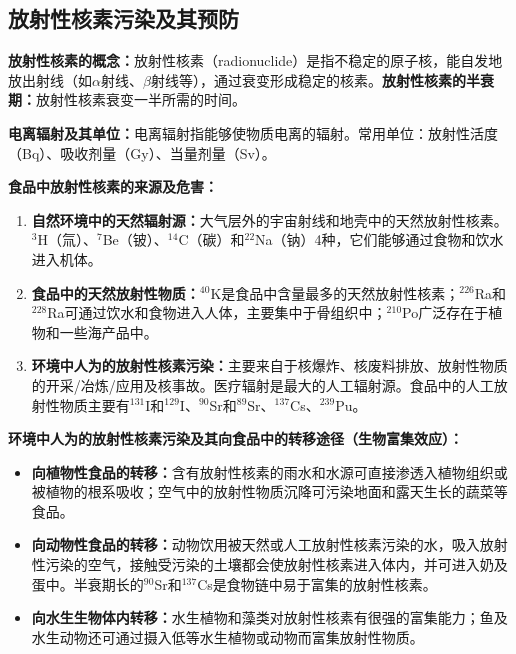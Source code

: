 \subsection{放射性核素污染及其预防}

\begin{defbox}
\textbf{放射性核素的概念：}放射性核素（radionuclide）是指不稳定的原子核，能自发地放出射线（如$\alpha$射线、$\beta$射线等），通过衰变形成稳定的核素。\textbf{放射性核素的半衰期：}放射性核素衰变一半所需的时间。

\textbf{电离辐射及其单位：}电离辐射指能够使物质电离的辐射。常用单位：放射性活度（Bq）、吸收剂量（Gy）、当量剂量（Sv）。

\textbf{食品中放射性核素的来源及危害：}
\begin{enumerate}[leftmargin=*]
    \item \textbf{自然环境中的天然辐射源：}大气层外的宇宙射线和地壳中的天然放射性核素。$^3$H（氚）、$^7$Be（铍）、$^{14}$C（碳）和$^{22}$Na（钠）4种，它们能够通过食物和饮水进入机体。
    \item \textbf{食品中的天然放射性物质：}$^{40}$K是食品中含量最多的天然放射性核素；$^{226}$Ra和$^{228}$Ra可通过饮水和食物进入人体，主要集中于骨组织中；$^{210}$Po广泛存在于植物和一些海产品中。
    \item \textbf{环境中人为的放射性核素污染：}主要来自于核爆炸、核废料排放、放射性物质的开采/冶炼/应用及核事故。医疗辐射是最大的人工辐射源。食品中的人工放射性物质主要有$^{131}$I和$^{129}$I、$^{90}$Sr和$^{89}$Sr、$^{137}$Cs、$^{239}$Pu。
\end{enumerate}

\textbf{环境中人为的放射性核素污染及其向食品中的转移途径（生物富集效应）：}
\begin{itemize}[leftmargin=*]
    \item \textbf{向植物性食品的转移：}含有放射性核素的雨水和水源可直接渗透入植物组织或被植物的根系吸收；空气中的放射性物质沉降可污染地面和露天生长的蔬菜等食品。
    \item \textbf{向动物性食品的转移：}动物饮用被天然或人工放射性核素污染的水，吸入放射性污染的空气，接触受污染的土壤都会使放射性核素进入体内，并可进入奶及蛋中。半衰期长的$^{90}$Sr和$^{137}$Cs是食物链中易于富集的放射性核素。
    \item \textbf{向水生生物体内转移：}水生植物和藻类对放射性核素有很强的富集能力；鱼及水生动物还可通过摄入低等水生植物或动物而富集放射性物质。
\end{itemize}


\end{defbox}
